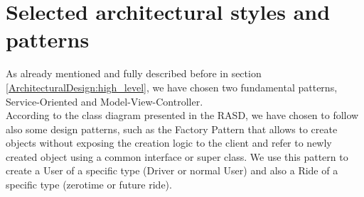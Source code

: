 \documentclass[\mainpath/main]{subfiles}
\begin{document}
\section{Selected architectural styles and patterns}
\label{ArchitecturalDesign:design_patterns}
As already mentioned and fully described before in section \ref{ArchitecturalDesign:high_level}, we have chosen two fundamental patterns, Service-Oriented and Model-View-Controller.\\
According to the class diagram presented in the RASD, we have chosen to follow also some design patterns, such as the Factory Pattern that allows to create objects without exposing the creation logic to the client and refer to newly created object using a common interface or super class. We use this pattern to create a User of a specific type (Driver or normal User) and also a Ride of a specific type (zerotime or future ride).


\end{document}
